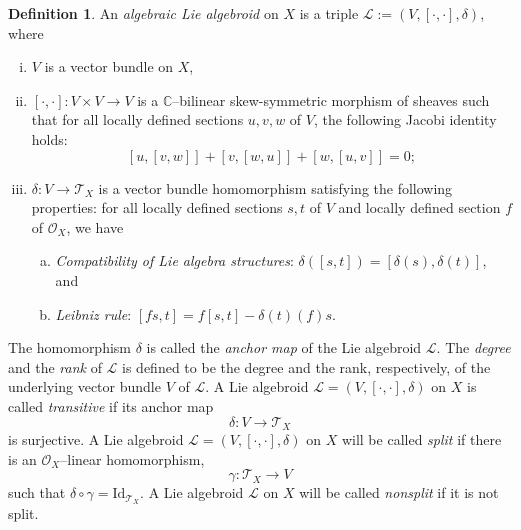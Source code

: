\documentclass[12pt,reqno]{amsart}
\newcommand{\mc}[1]{\mathcal{#1}}
\newcommand{\bb}[1]{\mathbb{#1}}
\numberwithin{equation}{subsection}
\theoremstyle{definition}
\newtheorem{defn}[equation]{Definition}
\theoremstyle{theorem}
\begin{document}
\begin{defn}\cite[\S\,3.1]{Alfaya-Oliveire-2024}
	An {\it algebraic Lie algebroid} on $X$ is a triple $\mc L := (V, [\cdot, \cdot], \delta)$, where 
	\begin{enumerate}[(i)]
		\item $V$ is a vector bundle on $X$, 
		
		\item $[\cdot, \cdot] : V\times V \to V$ is a $\bb C$--bilinear skew-symmetric 
		morphism of sheaves such that for all locally defined sections 
		$u, v, w$ of $V$, the following Jacobi identity holds: 
		$$[u, [v, w]]+[v, [w, u]]+[w, [u, v]] = 0;$$
		
		\item $\delta : V \to \mathcal{T}_{X}$ is a vector bundle homomorphism 
		satisfying the following properties: for all locally defined sections $s, t$ of $V$ and 
		locally defined section $f$ of $\mc O_X$, we have 
		\begin{enumerate}[(a)]
			\item {\it Compatibility of Lie algebra structures}: 
			$\delta([s, t]) = [\delta(s), \delta(t)]$, and 
			\item {\it Leibniz rule}: $[fs, t] = f[s, t] - \delta(t)(f)s$.
		\end{enumerate}
	\end{enumerate}
	The homomorphism $\delta$ is called the {\it anchor map} of the Lie algebroid $\mc L$. 
	The {\it degree} and the {\it rank} of $\mathcal{L}$ is defined to be the degree and the rank, respectively, of the underlying vector bundle $V$ of $\mc L$. A Lie algebroid $\mathcal{L} = (V,[\cdot,\cdot],\delta)$ on $X$ is called
	\emph{transitive} if its anchor map
	\[
	\delta : V \longrightarrow \mathcal{T}_X
	\]
	is surjective.
	A Lie algebroid $\mathcal{L}=(V,[\cdot,\cdot],\delta)$ on $X$ will be called \textit{split} if there is an $\mathcal{O}_{X}$--linear homomorphism,
	\[\gamma:\mathcal{T}_{X}\rightarrow V\]
	such that $\delta\circ \gamma = \text{Id}_{\mathcal{T}_{X}}$. A Lie algebroid $\mathcal{L}$ on $X$ will be called \textit{nonsplit} if it is not split.
\end{defn}
\end{document}
